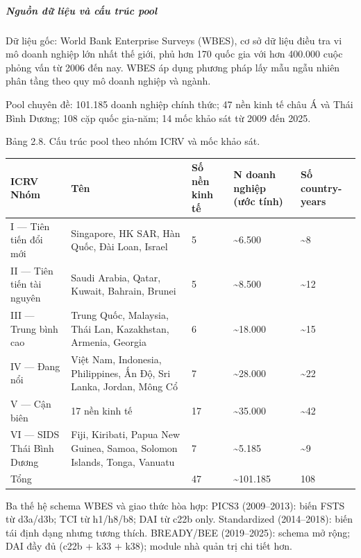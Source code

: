 \documentclass[12pt,a4paper]{article}
\begin{document}
\hypertarget{nguux1ed3n-dux1eef-liux1ec7u-vuxe0-cux1ea5u-truxfac-pool}{%
\subparagraph{Nguồn dữ liệu và cấu trúc
pool}\label{nguux1ed3n-dux1eef-liux1ec7u-vuxe0-cux1ea5u-truxfac-pool}}

Dữ liệu gốc: World Bank Enterprise Surveys (WBES), cơ sở dữ liệu điều
tra vi mô doanh nghiệp lớn nhất thế giới, phủ hơn 170 quốc gia với hơn
400.000 cuộc phỏng vấn từ 2006 đến nay. WBES áp dụng phương pháp lấy mẫu
ngẫu nhiên phân tầng theo quy mô doanh nghiệp và ngành.

Pool chuyên đề: 101.185 doanh nghiệp chính thức; 47 nền kinh tế châu Á
và Thái Bình Dương; 108 cặp quốc gia-năm; 14 mốc khảo sát từ 2009 đến
2025.

Bảng 2.8. Cấu trúc pool theo nhóm ICRV và mốc khảo sát.

\begin{longtable}[]{@{}lllll@{}}
\toprule\noalign{}
ICRV Nhóm & Tên & Số nền kinh tế & N doanh nghiệp (ước tính) & Số
country-years \\
\midrule\noalign{}
\endhead
\bottomrule\noalign{}
\endlastfoot
I --- Tiên tiến đổi mới & Singapore, HK SAR, Hàn Quốc, Đài Loan, Israel
& 5 & \textasciitilde6.500 & \textasciitilde8 \\
II --- Tiên tiến tài nguyên & Saudi Arabia, Qatar, Kuwait, Bahrain,
Brunei & 5 & \textasciitilde8.500 & \textasciitilde12 \\
III --- Trung bình cao & Trung Quốc, Malaysia, Thái Lan, Kazakhstan,
Armenia, Georgia & 6 & \textasciitilde18.000 & \textasciitilde15 \\
IV --- Đang nổi & Việt Nam, Indonesia, Philippines, Ấn Độ, Sri Lanka,
Jordan, Mông Cổ & 7 & \textasciitilde28.000 & \textasciitilde22 \\
V --- Cận biên & 17 nền kinh tế & 17 & \textasciitilde35.000 &
\textasciitilde42 \\
VI --- SIDS Thái Bình Dương & Fiji, Kiribati, Papua New Guinea, Samoa,
Solomon Islands, Tonga, Vanuatu & 7 & \textasciitilde5.185 &
\textasciitilde9 \\
Tổng & & 47 & \textasciitilde101.185 & 108 \\
\end{longtable}

Ba thế hệ schema WBES và giao thức hòa hợp: PICS3 (2009--2013): biến
FSTS từ d3a/d3b; TCI từ h1/h8/b8; DAI từ c22b only. Standardized
(2014--2018): biến tái định dạng nhưng tương thích. BREADY/BEE
(2019--2025): schema mở rộng; DAI đầy đủ (c22b + k33 + k38); module nhà
quản trị chi tiết hơn.
\end{document}
